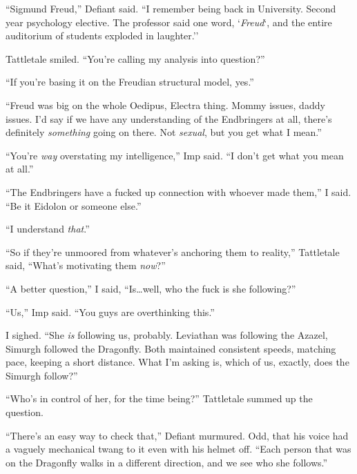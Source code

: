 ``Sigmund Freud,'' Defiant said.  ``I remember being back in University.  Second year psychology elective.  The professor said one word, `\emph{Freud}`, and the entire auditorium of students exploded in laughter.''



Tattletale smiled.  ``You're calling my analysis into question?''



``If you're basing it on the Freudian structural model, yes.''



``Freud was big on the whole Oedipus, Electra thing.  Mommy issues, daddy issues.  I'd say if we have any understanding of the Endbringers at all, there's definitely \emph{something} going on there.  Not \emph{sexual}, but you get what I mean.''



``You're \emph{way} overstating my intelligence,'' Imp said.  ``I don't get what you mean at all.''



``The Endbringers have a fucked up connection with whoever made them,'' I said.  ``Be it Eidolon or someone else.''



``I understand \emph{that}.''



``So if they're unmoored from whatever's anchoring them to reality,'' Tattletale said, ``What's motivating them \emph{now}?''



``A better question,'' I said, ``Is\ldots well, who the fuck is she following?''



``Us,'' Imp said.  ``You guys are overthinking this.''



I sighed.  ``She \emph{is} following us, probably.  Leviathan was following the Azazel, Simurgh followed the Dragonfly.  Both maintained consistent speeds, matching pace, keeping a short distance.  What I'm asking is, which of us, exactly, does the Simurgh follow?''



``Who's in control of her, for the time being?''  Tattletale summed up the question.



``There's an easy way to check that,'' Defiant murmured.  Odd, that his voice had a vaguely mechanical twang to it even with his helmet off.  ``Each person that was on the Dragonfly walks in a different direction, and we see who she follows.''



